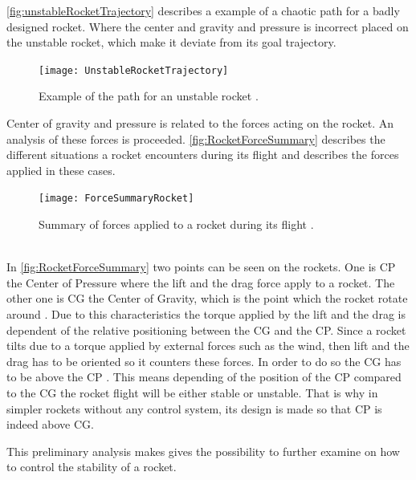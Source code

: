 \autoref{fig:unstableRocketTrajectory} describes a example of a chaotic path for a badly designed rocket. Where the center and gravity and pressure is incorrect placed on the unstable rocket, which make it deviate from its goal trajectory.  

\begin{figure} [htbp]
	\centering
	\texttt{[image: UnstableRocketTrajectory]}
	\caption{Example of the path for an unstable rocket \cite{web:rocketnasa}.}
	\label{fig:unstableRocketTrajectory}
\end{figure}

Center of gravity and pressure is related to the forces acting on the rocket. An analysis of these forces is proceeded. \autoref{fig:RocketForceSummary} describes the different situations a rocket encounters during its flight and describes the forces applied in these cases.
\begin{figure}[htbp]
	\centering
	\texttt{[image: ForceSummaryRocket]}
	\caption{Summary of forces applied to a rocket during its flight \cite{web:rocketnasa}.}
	\label{fig:RocketForceSummary}
\end{figure}
\\
In \autoref{fig:RocketForceSummary} two points can be seen on the rockets. One is CP the Center of Pressure where the lift and the drag force apply \cite{web:rocketnasa} to a rocket. The other one is CG the Center of Gravity, which is the point which the rocket rotate around \cite{web:rocketnasa}. Due to this characteristics the torque applied by the lift and the drag is dependent of the relative positioning between the CG and the CP. Since a rocket tilts due to a torque applied by external forces such as the wind, then lift and the drag has to be oriented so it counters these forces. In order to do so the CG has to be above the CP \cite{web:rocketnasa}.
This means depending of the position of the CP compared to the CG the rocket flight will be either stable or unstable. That is why in simpler rockets without any control system, its design is made so that CP is indeed above CG.

This preliminary analysis makes gives the possibility to further examine on how to control the stability of a rocket.


